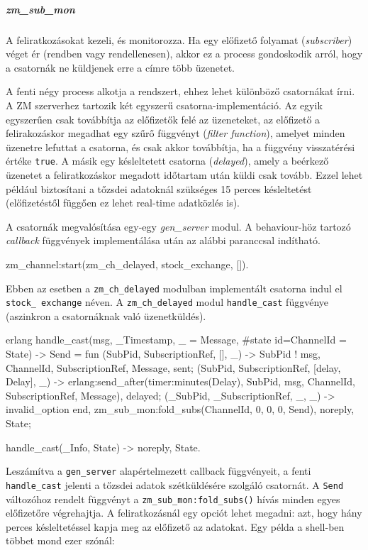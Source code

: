 \documentclass[12pt, a4paper, oneside]{book}
\begin{document}
\subparagraph{zm\_sub\_mon} A feliratkozásokat kezeli, és monitorozza. Ha egy
előfizető folyamat (\emph{subscriber}) véget ér (rendben vagy rendellenesen),
akkor ez a process gondoskodik arról, hogy a csatornák ne küldjenek erre a
címre több üzenetet.

A fenti négy process alkotja a rendszert, ehhez lehet különböző csatornákat
írni. A ZM szerverhez tartozik két egyszerű csatorna-implementáció. Az egyik
egyszerűen csak továbbítja az előfizetők felé az üzeneteket, az előfizető a
felirakozáskor megadhat egy szűrő függvényt (\emph{filter function}), amelyet
minden üzenetre lefuttat a csatorna, és csak akkor továbbítja, ha a függvény
visszatérési értéke \texttt{true}. A másik egy késleltetett csatorna
(\emph{delayed}), amely a beérkező üzenetet a feliratkozáskor megadott
időtartam után küldi csak tovább. Ezzel lehet például biztosítani a tőzsdei
adatoknál szükséges 15 perces késleltetést (előfizetéstől függően ez lehet
real-time adatközlés is).

A csatornák megvalósítása egy-egy \emph{gen\_server} modul. A behaviour-höz
tartozó \emph{callback} függvények implementálása után az alábbi paranccsal indítható.

\begin{code}{}{}
zm_channel:start(zm_ch_delayed, stock_exchange, []).
\end{code}

Ebben az esetben a \texttt{zm\_ch\_delayed} modulban implementált csatorna indul el
\texttt{stock\_ exchange} néven. A \texttt{zm\_ch\_delayed} modul \texttt{handle\_cast}
függvénye (aszinkron a csatornáknak való üzenetküldés). 

\begin{code}{erlang}{}
handle_cast({msg, {_Timestamp, _} = Message}, 
            #state{ id=ChannelId } = State) ->
  Send = fun
    ({SubPid, SubscriptionRef, []}, _) ->
      SubPid ! {msg, {ChannelId, SubscriptionRef}, Message},
      sent;
    ({SubPid, SubscriptionRef, [{delay, Delay}]}, _) ->
      erlang:send_after(timer:minutes(Delay), 
                        SubPid, 
                        {msg, {ChannelId, SubscriptionRef}, 
                        Message}),
      delayed;
    ({_SubPid, _SubscriptionRef, _}, _) ->
      invalid_option
  end,
  zm_sub_mon:fold_subs(ChannelId, {0, 0, 0}, Send),
  {noreply, State};

handle_cast(_Info, State) ->
  {noreply, State}.
\end{code}

Leszámítva a \texttt{gen\_server} alapértelmezett callback függvényeit, a fenti
\texttt{handle\_cast} jelenti a tőzsdei adatok szétküldésére szolgáló
csatornát. A \texttt{Send} változóhoz rendelt függvényt a
\texttt{zm\_sub\_mon:fold\_subs()} hívás minden egyes előfizetőre végrehajtja. A
feliratkozásnál egy opciót lehet megadni: azt, hogy hány perces késleltetéssel
kapja meg az előfizető az adatokat. Egy példa a shell-ben többet mond ezer
szónál: 
\end{document}
